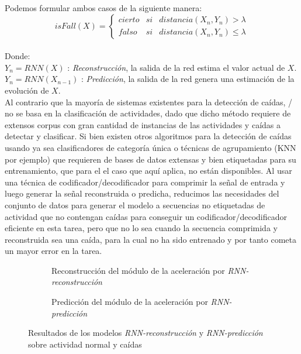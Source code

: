 Podemos formular ambos casos de la siguiente manera:
\[
  isFall(X)=\left\{
    \begin{array}{lcl}
      cierto & si & distancia(X_n,Y_n) > \lambda \\
      falso & si & distancia(X_n,Y_n) \leq  \lambda
    \end{array}
    \right.
\]
\\
Donde:\\
$Y_n = RNN(X)$ : \textsl{Reconstrucción}, la salida de la red estima el valor actual de $X$.\\
$Y_n = RNN(X_{n-1})$ : \textsl{Predicción}, la salida de la red genera una estimación de la evolución de $X$.\\

Al contrario que la mayoría de sistemas existentes para la detección de caídas, \ifell/ no se basa en la clasificación de actividades, dado que dicho método requiere de extensos corpus con gran cantidad de instancias de las actividades y caídas a detectar y clasificar. Si bien existen otros algoritmos  para la detección de caídas usando ya sea clasificadores de categoría única o técnicas de agrupamiento (KNN por ejemplo) que requieren de bases de datos extensas y bien etiquetadas para su entrenamiento, que para el el caso que aquí aplica, no están disponibles. Al usar una técnica de codificador/decodificador para comprimir la señal de entrada y luego generar la señal reconstruida o predicha, reducimos las necesidades del conjunto de datos para generar el modelo a secuencias no etiquetadas de actividad que no contengan caídas para conseguir un codificador/decodificador eficiente en esta tarea, pero que no lo sea cuando la secuencia comprimida y reconstruida sea una caída, para la cual no ha sido entrenado y por tanto cometa un mayor error en la tarea.

\begin{figure}[!ht]
  \centering
  \begin{subfigure}[b]{0.48\textwidth}
      \centering
      \caption{\footnotesize \footnotesize \label{fig:reconstruccionAceleracion}Reconstrucción del módulo de la aceleración por \textit{RNN-reconstrucción}}
  \end{subfigure}
  \hfill
  \begin{subfigure}[b]{0.48\textwidth}
      \centering
      \caption{\footnotesize \footnotesize \label{fig:prediccionAceleracion}Predicción del módulo de la aceleración por \textit{RNN-predicción}}
  \end{subfigure}
  \caption{\label{fig:predict:vs:reconst} Resultados de los modelos \textit{RNN-reconstrucción} y \textit{RNN-predicción} sobre actividad normal y caídas}
\end{figure}

